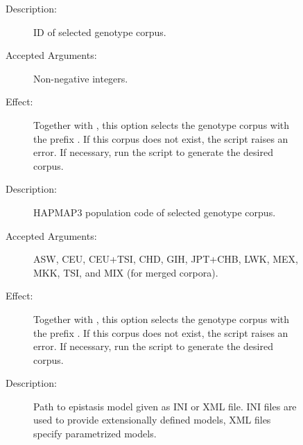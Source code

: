 \documentclass[a4paper,10pt,english]{sphinxhowto}
\begin{document}
\begin{description}
\item[{}] \leavevmode\begin{description}
\item[{}] \leavevmode\begin{description}
\item[{Description:}] \leavevmode
ID of selected genotype corpus.

\item[{Accepted Arguments:}] \leavevmode
Non-negative integers.

\item[{Effect:}] \leavevmode
Together with , this option selects the genotype corpus with the prefix .
If this corpus does not exist, the script raises an error. If necessary, run the script 
to generate the desired corpus.

\end{description}

\item[{}] \leavevmode\begin{description}
\item[{Description:}] \leavevmode
HAPMAP3 population code of selected genotype corpus.

\item[{Accepted Arguments:}] \leavevmode
ASW, CEU, CEU+TSI, CHD, GIH, JPT+CHB, LWK, MEX, MKK, TSI, and MIX (for merged corpora).

\item[{Effect:}] \leavevmode
Together with , this option selects the genotype corpus with the prefix .
If this corpus does not exist, the script raises an error. If necessary, run the script 
to generate the desired corpus.

\end{description}

\item[{}] \leavevmode\begin{description}
\item[{Description:}] \leavevmode
Path to epistasis model given as INI or XML file.
INI files are used to provide extensionally defined models, XML files specify parametrized models.


\end{description}
\end{description}
\end{description}
\end{document}
